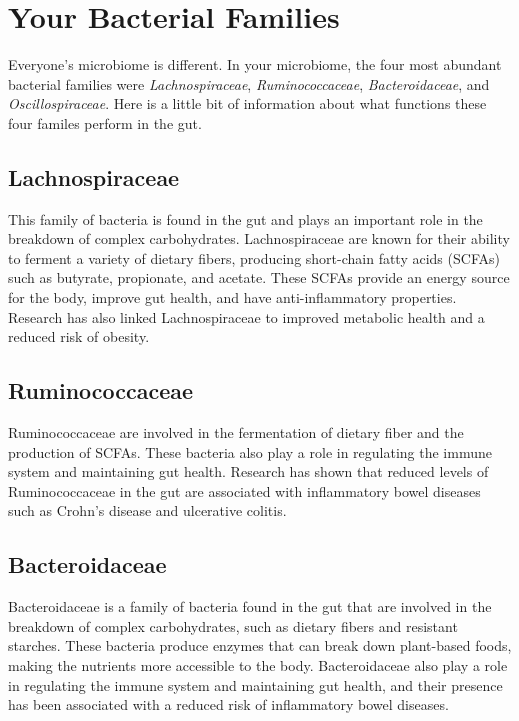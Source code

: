 \documentclass[
]{article}
\begin{document}
\newpage

\section{Your Bacterial Families}

Everyone's microbiome is different. In your microbiome, the four most
abundant bacterial families were \textit{Lachnospiraceae},
\textit{Ruminococcaceae}, \textit{Bacteroidaceae}, and
\textit{Oscillospiraceae}. Here is a little bit of information about
what functions these four familes perform in the gut.

\subsection{Lachnospiraceae}

\begin{small}
This family of bacteria is found in the gut and plays an important role in the 
breakdown of complex carbohydrates. Lachnospiraceae are known for their ability 
to ferment a variety of dietary fibers, producing short-chain fatty acids 
(SCFAs) such as butyrate, propionate, and acetate. These SCFAs provide an energy
source for the body, improve gut health, and have anti-inflammatory properties. 
Research has also linked Lachnospiraceae to improved metabolic health and a 
reduced risk of obesity.
\end{small}

\subsection{Ruminococcaceae}

\begin{small}
Ruminococcaceae are involved in the fermentation of dietary fiber and the 
production of SCFAs. These bacteria also play a role in regulating the immune 
system and maintaining gut health. Research has shown that reduced levels of 
Ruminococcaceae in the gut are associated with inflammatory bowel diseases such 
as Crohn's disease and ulcerative colitis.
\end{small}

\subsection{Bacteroidaceae}

\begin{small}
Bacteroidaceae is a family of bacteria found in the gut that are involved in the
breakdown of complex carbohydrates, such as dietary fibers and resistant 
starches. These bacteria produce enzymes that can break down plant-based foods, 
making the nutrients more accessible to the body. Bacteroidaceae also play a 
role in regulating the immune system and maintaining gut health, and their 
presence has been associated with a reduced risk of inflammatory bowel diseases.
\end{small}
\end{document}
